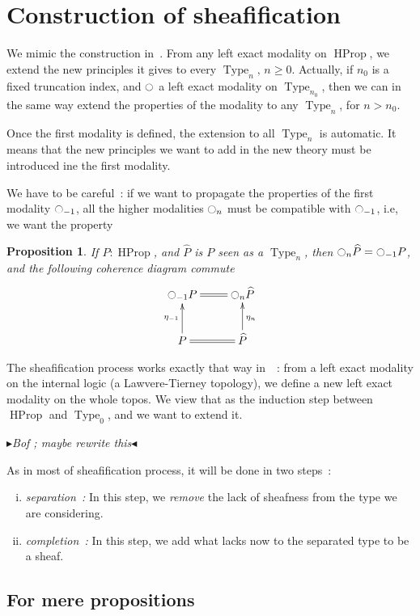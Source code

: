 \documentclass[conference]{IEEEtran}
\newtheorem{prop}[thm]{Proposition}
\newcommand{\mynote}[2]{
    \fbox{\bfseries\sffamily\scriptsize#1}
    {\small$\blacktriangleright$\textsf{\emph{#2}}$\blacktriangleleft$}~}
\newcommand\kq[1]{\mynote{KQ}{#1}}
\newcommand{\ie}{i.e,\xspace}
\DeclareMathOperator{\Type}{Type}
\DeclareMathOperator{\HProp}{HProp}
\newcommand{\modal}{\ensuremath{\ocircle}}
\begin{document}
\section{Construction of sheafification}
\label{sec:sheafification}

We mimic the construction in~\cite{maclanemoerdijk}. 
From any left exact modality on $\HProp$, we extend the new principles
it gives to every $\Type_n,\,n\geqslant 0$.
Actually, if $n_0$ is a fixed truncation index, and $\modal$ a left
exact modality on $\Type_{n_0}$, then we can in the same
way extend the properties of the modality to any $\Type_n$, for
$n > n_0$.

Once the first modality is defined, the extension to all $\Type_n$ is
automatic. It means that the new principles we want to add in the new
theory must be introduced ine the first modality. 

We have to be careful~: if we want to propagate the properties of the
first modality $\modal_{-1}$, all the higher modalities $\modal_n$ must be compatible
with $\modal_{-1}$, \ie we want the property
\begin{prop}\label{prop:hprop}
  If $P:\HProp$, and $\widehat P$ is $P$ seen as a $\Type_n$, then $\modal_n \widehat P = \modal_{-1} P$, and the
  following coherence diagram commute 
  $$\xymatrix{
    \modal_{-1} P \ar@{=}[r] & \modal_n \widehat P \\
    P \ar@{=}[r] \ar[u]^{\eta_{-1}} & \widehat P \ar[u]_{\eta_n}
  }$$
\end{prop}

The sheafification process works exactly that way
in~\cite{maclanemoerdijk}~: from a left exact modality on the internal
logic (a Lawvere-Tierney topology), we define a new left exact
modality on the whole topos. We view that as the induction step
between $\HProp$ and $\Type_0$, and we want to extend it.

\kq{Bof ; maybe rewrite this}

As in most of sheafification process, it will be done in
two steps~:
\begin{enumerate}[(i)]
\item {\em separation~:} In this step, we {\em remove} the lack of
  sheafness from the type we are considering.
\item {\em completion~:} In this step, we add what lacks now to the
  separated type to be a sheaf.
\end{enumerate}
\subsection{For mere propositions}
\label{ssec:h-propositions}
\end{document}
